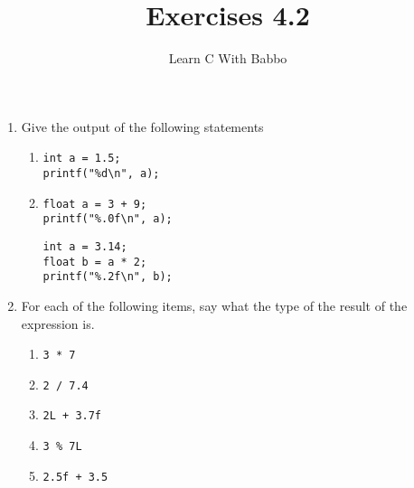 \documentclass{article}
\begin{document}
\title{Exercises 4.2}
\author{Learn C With Babbo}
\date{}
\maketitle

\begin{enumerate}
\item Give the output of the following statements

\begin{enumerate}
\item 
\begin{lstlisting}[style=CStyle]
int a = 1.5;
printf("%d\n", a);
\end{lstlisting}

\item
\begin{lstlisting}[style=CStyle]
float a = 3 + 9;
printf("%.0f\n", a);
\end{lstlisting}

\begin{lstlisting}[style=CStyle]
int a = 3.14;
float b = a * 2;
printf("%.2f\n", b);
\end{lstlisting}
\end{enumerate}

\item For each of the following items, say what the type of the result of the expression is.
\begin{enumerate}

\item 
\begin{lstlisting}[style=CStyle]
3 * 7
\end{lstlisting}

\item
\begin{lstlisting}[style=CStyle]
2 / 7.4
\end{lstlisting}

\item 
\begin{lstlisting}[style=CStyle]
2L + 3.7f
\end{lstlisting}

\item
\begin{lstlisting}[style=CStyle]
3 % 7L
\end{lstlisting}

\item
\begin{lstlisting}[style=CStyle]
2.5f + 3.5
\end{lstlisting}


\end{enumerate}
\end{enumerate}
\end{document}
